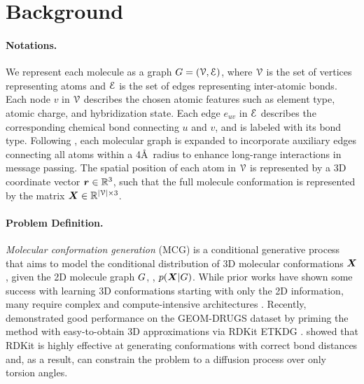 \section{Background}
\label{section:background}
\paragraph{Notations.} We represent each molecule as a graph ${G} =  ({\mathcal{V}}, {\mathcal{E}})$, where ${\mathcal{V}}$ is the set of vertices representing atoms and ${\mathcal{E}}$ is the set of edges representing inter-atomic bonds. Each node $v$ in ${\mathcal{V}}$ describes the chosen atomic features such as element type, atomic charge, and hybridization state. Each edge $e_{uv}$ in ${\mathcal{E}}$ describes the corresponding chemical bond connecting $u$ and $v$, and is labeled with its bond type. Following \citet{GraphDG}, each molecular graph is expanded to incorporate auxiliary edges connecting all atoms within a 4\AA\ radius to enhance long-range interactions in message passing.
The spatial position of each atom in ${\mathcal{V}}$ is represented by a 3D coordinate vector ${\bm{r}} \in {\mathbb{R}}^{3}$, such that the full molecule conformation is represented by the matrix ${\bm{X}} \in {\mathbb{R}}^{|{\mathcal{V}}| \times 3}$. 

\paragraph{Problem Definition.} \emph{Molecular conformation generation} (MCG) is a conditional generative process that aims to model the conditional distribution of 3D molecular conformations ${\bm{X}}$, given the 2D molecule graph ${G}$, \ie, $p({\bm{X}} | {G})$. While prior works have shown some success with learning 3D conformations starting with only the 2D information, many require complex and compute-intensive architectures \citep{DMCG, unimol}. Recently, \citet{torsional-diffusion} demonstrated good performance on the GEOM-DRUGS dataset by priming the method with easy-to-obtain 3D approximations via RDKit ETKDG \citep{rdkit}. \citet{torsional-diffusion} showed that RDKit is highly effective at generating conformations with correct bond distances and, as a result, can constrain the problem to a diffusion process over only torsion angles.

